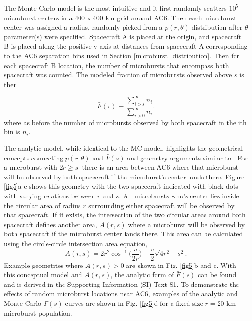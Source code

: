 \documentclass[draft]{agujournal2019}
\begin{document}
The Monte Carlo model is the most intuitive and it first randomly scatters $10^5$ microburst centers in a 400 x 400 km grid around AC6. Then each microburst center was assigned a radius, randomly picked from a $p(r, \theta)$ distribution after $\theta$ parameter(s) were specified. Spacecraft A is placed at the origin, and spacecraft B is placed along the positive y-axis at distances from spacecraft A corresponding to the AC6 separation bins used in Section \ref{microburst_distribution}. Then for each spacecraft B location, the number of microbursts that encompass both spacecraft was counted. The modeled fraction of microbursts observed above $s$ is then

\begin{equation}
\bar{F}(s) = \frac{\displaystyle\sum_{i > s}^\infty n_{i} }{ \displaystyle\sum_{i > 0}^\infty n_{i} }.
\end{equation} where as before the number of microbursts observed by both spacecraft in the ith bin is $n_{i}$.

The analytic model, while identical to the MC model, highlights the geometrical concepts connecting $p(r, \theta)$ and $\bar{F}(s)$ and geometry arguments similar to . For a microburst with $2r \geq s$, there is an area between AC6 where that microburst will be observed by both spacecraft if the microburst's center lands there. Figure \ref{fig5}a-c shows this geometry with the two spacecraft indicated with black dots with varying relations between $r$ and $s$. All microbursts who's center lies inside the circular area of radius $r$ surrounding either spacecraft will be observed by that spacecraft. If it exists, the intersection of the two circular areas around both spacecraft defines another area, $A(r, s)$ where a microburst will be observed by both spacecraft if the microburst center lands there. This area can be calculated using the circle-circle intersection area equation, 
\begin{equation}
A(r, s) = 2r^2 \cos^{-1}{\Big( \frac{s}{2r} \Big)} - \frac{s}{2} \sqrt{4r^2 - s^2}.
\end{equation} Example geometries where $A(r, s) > 0$ are shown in Fig. \ref{fig5}b and c. With this conceptual model and $A(r, s)$, the analytic form of $\bar{F}(s)$ can be found and is derived in the Supporting Information (SI) Text S1. To demonstrate the effects of random microburst locations near AC6, examples of the analytic and Monte Carlo $\bar{F}(s)$ curves are shown in Fig. \ref{fig5}d for a fixed-size $r=20$ km microburst population.
\end{document}

